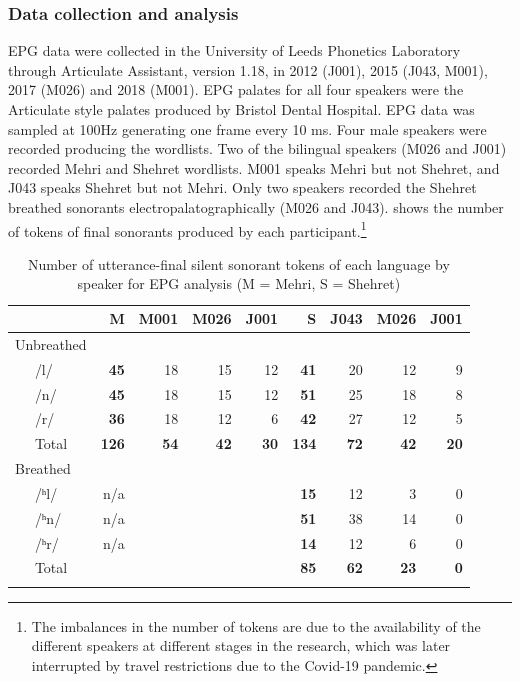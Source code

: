 \documentclass[output=paper]{langscibook}
\begin{document}
\subsubsection{Data collection and analysis} %
\label{sec:watson:4.3.1}
\largerpage[1.5]
EPG data were collected in the University of Leeds Phonetics Laboratory through Articulate Assistant, version 1.18, in 2012 (J001), 2015 (J043, M001), 2017 (M026) and 2018 (M001). EPG palates for all four speakers were the Articulate style palates produced by Bristol Dental Hospital. EPG data was sampled at 100Hz generating one frame every 10 ms. Four male speakers were recorded producing the wordlists. Two of the bilingual speakers (M026 and J001) recorded Mehri and Shehret wordlists. M001 speaks Mehri but not Shehret, and J043 speaks Shehret but not Mehri. Only two speakers recorded the Shehret breathed sonorants electropalatographically (M026 and J043).  shows the number of tokens of final sonorants produced by each participant.\footnote{The imbalances in the number of tokens are due to the availability of the different speakers at different stages in the research, which was later interrupted by travel restrictions due to the Covid-19 pandemic.}

\begin{table}
\caption{Number of utterance-final silent sonorant tokens of each language by speaker for EPG analysis (M = Mehri, S = Shehret)}
\label{tab:watson:6}
\begin{tabular}{llrrrrrrrr}
\lsptoprule
 & & \textbf{M} & M001 & M026 & J001 & \textbf{S} & J043 & M026 & J001\\
\midrule
\multicolumn{2}{l}{Unbreathed} &  &  &  &  &  &  &  & \\
& /l/ & \textbf{45} & 18 & 15 & 12 & \textbf{41} & 20 & 12 & 9\\
& /n/ & \textbf{45} & 18 & 15 & 12 & \textbf{51} & 25 & 18 & 8\\
& /r/ & \textbf{36} & 18 & 12 & 6 & \textbf{42} & 27 & 12 & 5\\
& Total & \textbf{126} & \textbf{54} & \textbf{42} & \textbf{30} & \textbf{134} & \textbf{72} & \textbf{42} & \textbf{20}\\
\midrule
\multicolumn{2}{l}{Breathed} &  &  &  &  &  &  &  & \\
& /ʰl/ & n/a &  &  &  & \textbf{15} & 12 & 3 & 0\\
& /ʰn/ & n/a &  &  &  & \textbf{51} & 38 & 14 & 0\\
& /ʰr/ & n/a &  &  &  & \textbf{14} & 12 & 6 & 0\\
& Total &  &  &  &  & \textbf{85} & \textbf{62} & \textbf{23} & \textbf{0}\\
\lspbottomrule
\end{tabular}
\end{table}
\end{document}
